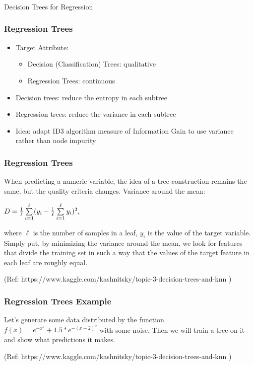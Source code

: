 \begin{frame}[fragile]\frametitle{}
\begin{center}
{\Large Decision Trees for Regression}
\end{center}
\end{frame}


\begin{frame}[fragile]\frametitle{Regression Trees}
\begin{itemize}
\item Target Attribute:

\begin{itemize}
\item Decision (Classification) Trees: qualitative
\item Regression Trees: continuous
\end{itemize}
\item Decision trees: reduce the entropy in each subtree
\item Regression trees: reduce the variance in each subtree
\item Idea: adapt ID3 algorithm measure of Information Gain to use variance rather than node impurity
\end{itemize}
\end{frame}


\begin{frame}[fragile]\frametitle{Regression Trees}
When predicting a numeric variable, the idea of a tree construction remains the same, but the quality criteria changes.
Variance around the mean:

$\Large D = \frac{1}{\ell} \sum\limits_{i =1}^{\ell} (y_i - \frac{1}{\ell} \sum\limits_{i =1}^{\ell} y_i)^2,$

where $\ell$ is the number of samples in a leaf,  $y_i$  is the value of the target variable. Simply put, by minimizing the variance around the mean, we look for features that divide the training set in such a way that the values of the target feature in each leaf are roughly equal.

{\tiny (Ref: https://www.kaggle.com/kashnitsky/topic-3-decision-trees-and-knn )}

\end{frame}


\begin{frame}[fragile]\frametitle{Regression Trees Example}
Let's generate some data distributed by the function $f(x) = e^{-x ^ 2} + 1.5 * e^{-(x - 2) ^ 2}$
  with some noise. Then we will train a tree on it and show what predictions it makes.


{\tiny (Ref: https://www.kaggle.com/kashnitsky/topic-3-decision-trees-and-knn )}

\end{frame}

